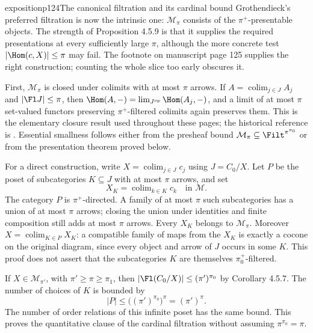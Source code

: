 \begin{dcomment}{exposition}{p124}{The canonical filtration and its cardinal bound}
Grothendieck's preferred filtration is now the intrinsic one: $\mathcal M_\pi$ consists of the $\pi^+$-presentable objects. The strength of Proposition 4.5.9 is that it supplies the required presentations at every sufficiently large $\pi$, although the more concrete test $|\Hom(c,X)|\leq\pi$ may fail. The footnote on manuscript page 125 supplies the right construction; counting the whole slice too early obscures it.

First, $\mathcal M_\pi$ is closed under colimits with at most $\pi$ arrows. If $A=\operatorname{colim}_{j\in J}A_j$ and $|\Fl J|\leq\pi$, then $\Hom(A,-)=\lim_{J^{\mathrm{op}}}\Hom(A_j,-)$, and a limit of at most $\pi$ set-valued functors preserving $\pi^+$-filtered colimits again preserves them. This is the elementary closure result used throughout these pages; the historical reference is \citet[Expos\'e I, 9.8--9.9]{SGA4I1972}. Essential smallness follows either from the presheaf bound $\mathcal M_\pi\subseteq\Filt^{\pi^{\pi_0}}$ or from the presentation theorem proved below.

For a direct construction, write $X=\operatorname{colim}_{j\in J}c_j$ using $J=C_0/X$. Let $P$ be the poset of subcategories $K\subseteq J$ with at most $\pi$ arrows, and set
\[
 X_K=\operatorname{colim}_{k\in K}c_k\quad\text{in }\mathcal M.
\]
The category $P$ is $\pi^+$-directed. A family of at most $\pi$ such subcategories has a union of at most $\pi$ arrows; closing the union under identities and finite composition still adds at most $\pi$ arrows. Every $X_K$ belongs to $\mathcal M_\pi$. Moreover $X=\operatorname{colim}_{K\in P}X_K$: a compatible family of maps from the $X_K$ is exactly a cocone on the original diagram, since every object and arrow of $J$ occurs in some $K$. This proof does not assert that the subcategories $K$ are themselves $\pi_0^+$-filtered.

If $X\in\mathcal M_{\pi'}$, with $\pi'\geq\pi\geq\pi_1$, then $|\Fl(C_0/X)|\leq(\pi')^{\pi_0}$ by Corollary 4.5.7. The number of choices of $K$ is bounded by
\[
 |P|\leq\bigl((\pi')^{\pi_0}\bigr)^\pi
      =(\pi')^\pi.
\]
The number of order relations of this infinite poset has the same bound. This proves the quantitative clause of the cardinal filtration without assuming $\pi^{\pi_0}=\pi$.


\end{dcomment}

